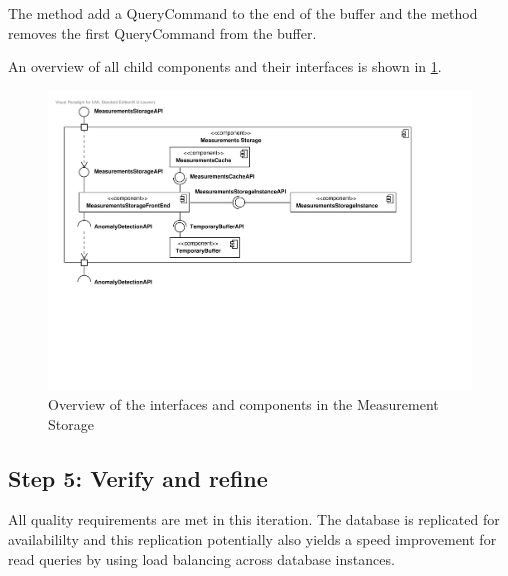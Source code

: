 \npar The method  add a QueryCommand to the end
of the buffer and the method  removes the first
QueryCommand from the buffer.

\npar An overview of all child components and their interfaces is shown in
\ref{fig:it4/interfaces}.

\begin{figure}[H]
	\begin{centering}
		\includegraphics[width=\textwidth]{figs/add-it4-interfaces.pdf}
		\caption{Overview of the interfaces and components in the Measurement Storage}
		\label{fig:it4/interfaces}
	\end{centering}
\end{figure}

\subsection{Step 5: Verify and refine}
\label{add:it4/verification}

\npar All quality requirements are met in this iteration. The database is
replicated for availabililty and this replication potentially also yields a
speed improvement for read queries by using load balancing across database
instances.
